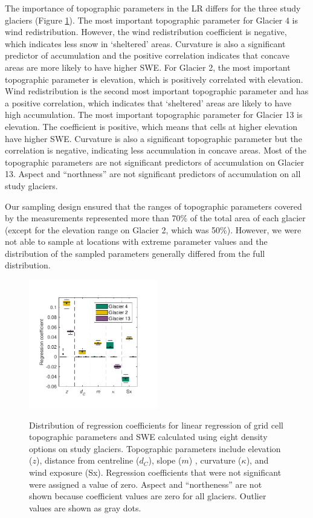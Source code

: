 \documentclass[review,oneside, letterpaper]{igs}
\begin{document}
The importance of topographic parameters in the LR differs for the three study glaciers (Figure \ref{fig:BetaCoeffs}). The most important topographic parameter for Glacier 4 is wind redistribution. However, the wind redistribution coefficient is negative, which indicates less snow in `sheltered' areas. Curvature is also a significant predictor of accumulation and the positive correlation indicates that concave areas are more likely to have higher SWE. For Glacier 2, the most important topographic parameter is elevation, which is positively correlated with elevation. Wind redistribution is the second most important topographic parameter and has a positive correlation, which indicates that `sheltered' areas are likely to have high accumulation. The most important topographic parameter for Glacier 13 is elevation. The coefficient is positive, which means that cells at higher elevation have higher SWE. Curvature is also a significant topographic parameter but the correlation is negative, indicating less accumulation in concave areas. Most of the topographic parameters are not significant predictors of accumulation on Glacier 13. Aspect and ``northness'' are not significant predictors of accumulation on all study glaciers.

Our sampling design ensured that the ranges of topographic parameters covered by the measurements represented more than 70\% of the total area of each glacier (except for the elevation range on Glacier 2, which was 50\%). However, we were not able to sample at locations with extreme parameter values and the distribution of the sampled parameters generally differed from the full distribution.


\begin{figure}
	\centering
	\includegraphics[width =0.5\textwidth]{BetaCoeffs.pdf}\\
	\caption{Distribution of regression coefficients for linear regression of grid cell topographic parameters and SWE calculated using eight density options on study glaciers. Topographic parameters include elevation ($z$), distance from centreline ($d_C$), slope ($m$) , curvature ($\kappa$), and wind exposure (Sx). Regression coefficients that were not significant were assigned a value of zero. Aspect and ``northeness'' are not shown because coefficient values are zero for all glaciers. Outlier values are shown as gray dots.}
	\label{fig:BetaCoeffs}
\end{figure}
\end{document}
